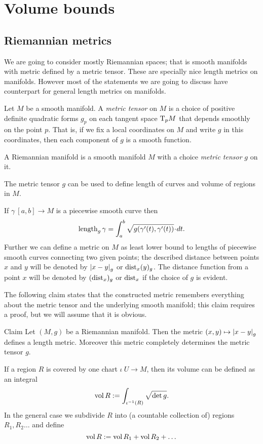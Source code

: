 \chapter{Volume bounds} 


\section{Riemannian metrics}

We are going to consider mostly Riemannian spaces;
that is smooth manifolds with metric defined by a metric tensor.
These are specially nice length metrics on manifolds.
However most of the statements we are going to discuss have counterpart for general length metrics on manifolds.

Let $M$ be a smooth manifold.
A \emph{metric tensor} on $M$ is a choice of positive definite quadratic forms $g_p$ on each tangent space $\mathrm{T}_pM$ that depends smoothly on the point $p$.
That is, if we fix a local coordinates on $M$ and write $g$ in this coordinates, then each component of $g$ is a smooth function. 

A Riemannian manifold is a smooth manifold $M$ with a choice \emph{metric tensor} $g$ on it.

The metric tensor $g$ can be used to define length of curves and volume of regions in $M$.

If $\gamma\:[a,b]\to M$ is a piecewise smooth curve then 
\[\length_g\gamma=\int_a^b\sqrt{g(\gamma'(t),\gamma'(t))}\cdot dt.\]
Further we can define a metric on $M$ as least lower bound to lengths of piecewise smooth curves connecting two given points;
the described distance between points $x$ and $y$ will be denoted by $\dist{x}{y}{g}$ or $\mathrm{dist}_x(y)_g$.
The distance function from a point $x$ will be denoted by $(\mathrm{dist}_x)_g$ or $\mathrm{dist}_x$ if the choice of $g$ is evident.

The following claim states that the constructed metric remembers everything about the metric tensor and the underlying smooth manifold;
this claim requires a proof, but we will assume that it is obvious.

\begin{thm}{Claim}
Let $(M,g)$ be a Riemannian manifold.
Then the metric $(x,y)\mapsto \dist{x}{y}{g}$ defines a length metric. Moreover this metric completely determines the metric tensor $g$.
\end{thm}

If a region $R$ is covered by one chart $\iota\:U\to M$,
then its volume can be defined as an integral 
\[\operatorname{\rm vol}\nolimits R
\mathrel{:=}
\int_{\iota^{-1}(R)}\sqrt{\det{g}}.\]
In the general case we subdivide $R$ into (a countable collection of) regions $R_1,R_2\dots$ and define
\[\operatorname{\rm vol}\nolimits R\mathrel{:=} \operatorname{\rm vol}\nolimits R_1+\operatorname{\rm vol}\nolimits R_2+\dots\]

